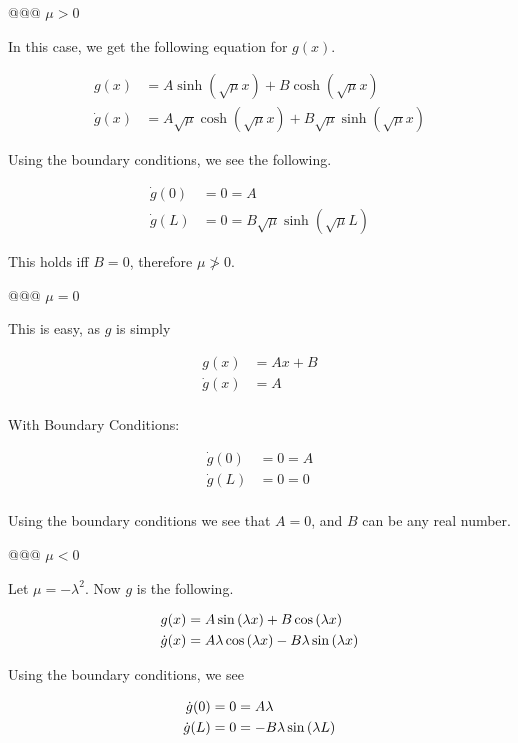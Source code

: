 \documentclass[10pt]{article}
\begin{document}
\begin{easylist}[enumerate]
    @@@ $\mu > 0$

    In this case, we get the following equation for $g(x)$.

    \begin{align*}
        g(x) &= A \sinh(\sqrt{\mu}x) + B \cosh(\sqrt{\mu}x)\\
        \dot{g}(x) &= A \sqrt{\mu} \cosh{\left (\sqrt{\mu} x \right )} + B \sqrt{\mu} \sinh{\left (\sqrt{\mu} x \right)}
    \end{align*}

    Using the boundary conditions, we see the following.

    \begin{align*}
        \dot{g}(0) &= 0 = A\\
        \dot{g}(L) &= 0 = B \sqrt{\mu} \sinh{\left (\sqrt{\mu} L \right)}
    \end{align*}

    This holds iff $B=0$, therefore $\mu \not> 0$.

    @@@ $\mu = 0$

    This is easy, as $g$ is simply

    \begin{align*}
        g(x) &= Ax + B\\
        \dot{g}(x) &= A\\
    \end{align*}

    With Boundary Conditions:

    \begin{align*}
        \dot{g}(0) &= 0 = A\\
        \dot{g}(L) &= 0 = 0\\
    \end{align*}

    Using the boundary conditions we see that $A = 0$, and $B$ can be any real number.

    @@@ $\mu < 0$

    Let $\mu = -\lambda^2$. Now $g$ is the following.

    \begin{align*}
        g(x) &= A \sin\left( \lambda x \right) + B \cos\left( \lambda x \right)\\
        \dot{g}(x) &= A \lambda \cos\left( \lambda x \right) - B \lambda \sin\left( \lambda x \right)\\
    \end{align*}

    Using the boundary conditions, we see

    \begin{align*}
        \dot{g}(0) &= 0 = A \lambda\\
        \dot{g}(L) &= 0 = - B \lambda \sin\left( \lambda L \right)\\
    \end{align*}


\end{easylist}
\end{document}
